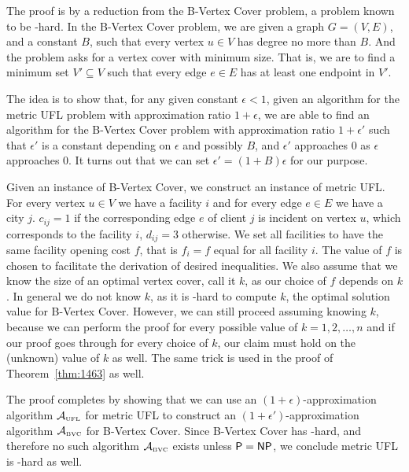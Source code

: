 \documentclass[oneside,final]{ucr}
\begin{document}
  The proof is by a reduction from the B-Vertex Cover
  problem, a problem known to be {\MaxSNP}-hard. In the
  B-Vertex Cover problem, we are given a graph $G=(V,E)$,
  and a constant $B$, such that every vertex $u\in V$ has
  degree no more than $B$. And the problem asks for a vertex
  cover with minimum size. That is, we are to find a minimum
  set $V' \subseteq V$ such that every edge $e \in E$ has at
  least one endpoint in $V'$.

  The idea is to show that, for any given constant $\epsilon
  < 1$, given an algorithm for the metric UFL problem with
  approximation ratio $1+\epsilon$, we are able to find an
  algorithm for the B-Vertex Cover problem with
  approximation ratio $1+\epsilon'$ such that $\epsilon'$ is
  a constant depending on $\epsilon$ and possibly $B$, and
  $\epsilon'$ approaches $0$ as $\epsilon$ approaches
  $0$. It turns out that we can set $\epsilon' =
  (1+B)\epsilon$ for our purpose.

  Given an instance of B-Vertex Cover, we construct an
  instance of metric UFL. For every vertex $u \in V$ we have
  a facility $i$ and for every edge $e \in E$ we have a city
  $j$. $c_{ij} = 1$ if the corresponding edge $e$ of client
  $j$ is incident on vertex $u$, which corresponds to the
  facility $i$, $d_{ij} = 3$ otherwise. We set all
  facilities to have the same facility opening cost $f$,
  that is $f_i = f$ equal for all facility $i$. The value of
  $f$ is chosen to facilitate the derivation of desired
  inequalities. We also assume that we know the size of an
  optimal vertex cover, call it $k$, as our choice of $f$
  depends on $k$. In general we do not know $k$, as it is
  {\NP}-hard to compute $k$, the optimal solution value for
  B-Vertex Cover. However, we can still proceed assuming
  knowing $k$, because we can perform the proof for every
  possible value of $k=1,2,\ldots,n$ and if our proof goes
  through for every choice of $k$, our claim must hold on
  the (unknown) value of $k$ as well. The same trick is used
  in the proof of Theorem~\ref{thm:1463} as well.

  The proof completes by showing that we can use an
  $(1+\epsilon)$-approximation algorithm $\calA_{\smallUFL}$
  for metric UFL to construct an
  $(1+\epsilon')$-approximation algorithm
  $\calA_{\smallBVC}$ for B-Vertex Cover. Since B-Vertex
  Cover has \MaxSNP-hard, and therefore no such algorithm
  $\calA_{\smallBVC}$ exists unless ${\mbox{\sf P}}={\mbox{\sf NP}}$, we conclude
  metric UFL is \MaxSNP-hard as well.
\end{document}
